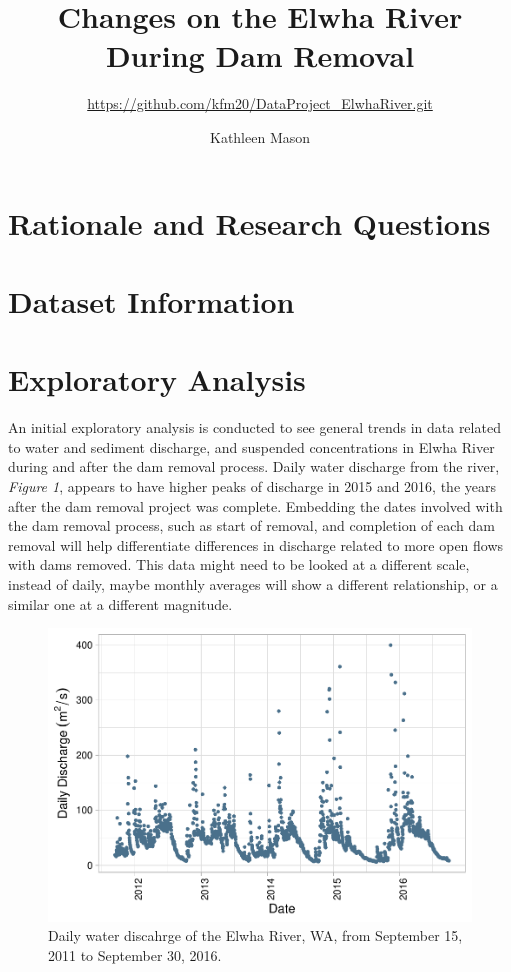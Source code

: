 \documentclass[12pt,]{article}
\title{Changes on the Elwha River During Dam Removal}
\subtitle{\url{https://github.com/kfm20/DataProject_ElwhaRiver.git}}
\author{Kathleen Mason}
\date{}
\begin{document}
\maketitle

\newpage
\tableofcontents 
\newpage
\listoftables 
\newpage
\listoffigures 
\newpage

\hypertarget{rationale-and-research-questions}{%
\section{Rationale and Research
Questions}\label{rationale-and-research-questions}}

\newpage

\hypertarget{dataset-information}{%
\section{Dataset Information}\label{dataset-information}}

\newpage

\hypertarget{exploratory-analysis}{%
\section{Exploratory Analysis}\label{exploratory-analysis}}

An initial exploratory analysis is conducted to see general trends in
data related to water and sediment discharge, and suspended
concentrations in Elwha River during and after the dam removal process.
Daily water discharge from the river, \emph{Figure 1}, appears to have
higher peaks of discharge in 2015 and 2016, the years after the dam
removal project was complete. Embedding the dates involved with the dam
removal process, such as start of removal, and completion of each dam
removal will help differentiate differences in discharge related to more
open flows with dams removed. This data might need to be looked at a
different scale, instead of daily, maybe monthly averages will show a
different relationship, or a similar one at a different magnitude.

\begin{figure}
\centering
\includegraphics{Mason_ENV872_ProjectFinal_files/figure-latex/Exploratory Analysis Figure 1-1.pdf}
\caption{Daily water discahrge of the Elwha River, WA, from September
15, 2011 to September 30, 2016.}
\end{figure}
\end{document}
